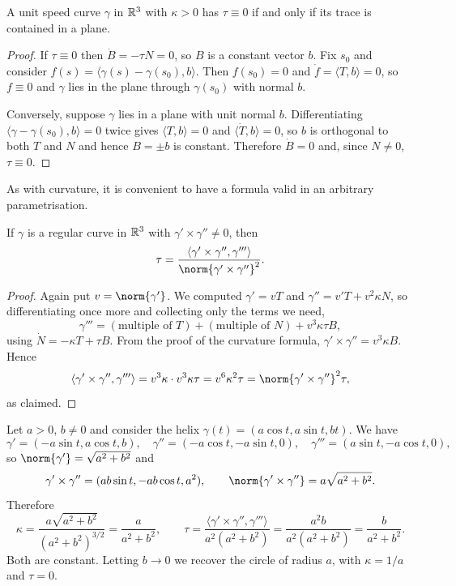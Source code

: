 \documentclass[a4paper]{scrartcl}
\begin{document}
\begin{proposition}
    A unit speed curve $\gamma$ in $\mathbb{R}^3$ with $\kappa > 0$ has $\tau \equiv 0$ if and only if its trace is contained in a plane.
\end{proposition}
\begin{proof}
    If $\tau \equiv 0$ then $\dot B = -\tau N = 0$, so $B$ is a constant vector $b$. Fix $s_0$ and consider $f(s) = \langle \gamma(s) - \gamma(s_0), b\rangle$. Then $f(s_0) = 0$ and $\dot f = \langle T, b \rangle = 0$, so $f \equiv 0$ and $\gamma$ lies in the plane through $\gamma(s_0)$ with normal $b$.

    Conversely, suppose $\gamma$ lies in a plane with unit normal $b$. Differentiating $\langle \gamma - \gamma(s_0), b \rangle = 0$ twice gives $\langle T, b \rangle = 0$ and $\langle \dot T, b\rangle = 0$, so $b$ is orthogonal to both $T$ and $N$ and hence $B = \pm b$ is constant. Therefore $\dot B = 0$ and, since $N \neq 0$, $\tau \equiv 0$.
\end{proof}

As with curvature, it is convenient to have a formula valid in an arbitrary parametrisation.

\begin{proposition}
    If $\gamma$ is a regular curve in $\mathbb{R}^3$ with $\gamma' \times \gamma'' \neq 0$, then
    $$
    \tau = \frac{\langle \gamma' \times \gamma'', \gamma'''\rangle}{\norm{\gamma' \times \gamma''}^2}.
    $$
\end{proposition}
\begin{proof}
    Again put $v = \norm{\gamma'}$. We computed $\gamma' = vT$ and $\gamma'' = v'T + v^2\kappa N$, so differentiating once more and collecting only the terms we need,
    $$
    \gamma''' = (\text{multiple of } T) + (\text{multiple of } N) + v^3 \kappa\tau B,
    $$
    using $\dot N = -\kappa T + \tau B$. From the proof of the curvature formula, $\gamma' \times \gamma'' = v^3\kappa B$. Hence
    $$
    \langle \gamma' \times \gamma'', \gamma'''\rangle = v^3\kappa \cdot v^3 \kappa \tau = v^6\kappa^2\tau = \norm{\gamma'\times\gamma''}^2 \tau,
    $$
    as claimed.
\end{proof}

\begin{example}
    Let $a > 0$, $b \neq 0$ and consider the helix $\gamma(t) = (a\cos t, a \sin t, bt)$. We have
    $$
    \gamma' = (-a \sin t, a\cos t, b), \quad \gamma'' = (-a\cos t, -a \sin t, 0), \quad \gamma''' = (a \sin t, -a\cos t, 0),
    $$
    so $\norm{\gamma'} = \sqrt{a^2+b^2}$ and
    $$
    \gamma'\times \gamma'' = (ab\sin t, -ab\cos t, a^2), \qquad \norm{\gamma' \times \gamma''} = a\sqrt{a^2+b^2}.
    $$
    Therefore
    $$
    \kappa = \frac{a\sqrt{a^2+b^2}}{(a^2+b^2)^{3/2}} = \frac{a}{a^2+b^2}, \qquad \tau = \frac{\langle \gamma'\times\gamma'', \gamma'''\rangle}{a^2(a^2+b^2)} = \frac{a^2 b}{a^2(a^2+b^2)} = \frac{b}{a^2+b^2}.
    $$
    Both are constant. Letting $b \to 0$ we recover the circle of radius $a$, with $\kappa = 1/a$ and $\tau = 0$.
\end{example}
\end{document}
